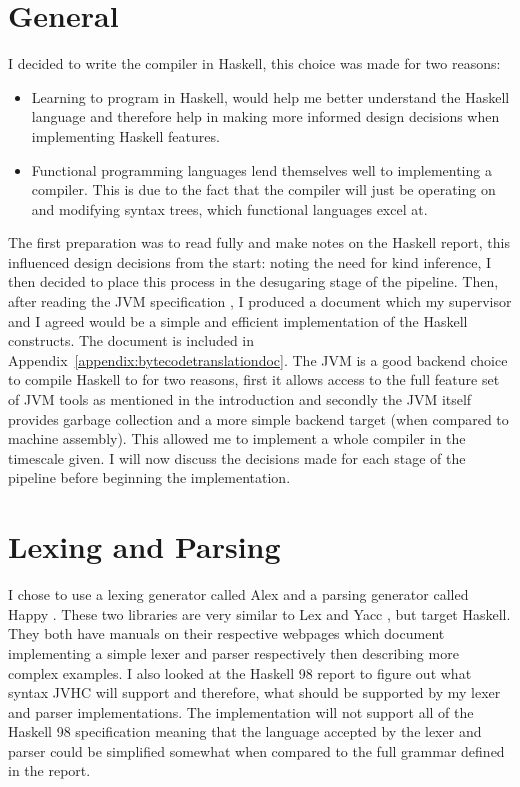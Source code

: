 \documentclass[float=false, crop=false]{standalone}
\begin{document}
\section{General}

I decided to write the compiler in Haskell, this choice was made for two reasons: 
\begin{itemize}
  \item Learning to program in Haskell, would help me better understand the Haskell language
    and therefore help in making more informed design decisions when implementing Haskell features.

  \item Functional programming languages lend themselves well to implementing a compiler. This is due to the fact that the compiler will just be operating
    on and modifying syntax trees, which functional languages excel at.

\end{itemize}

  The first preparation was to read fully and make notes on
  the Haskell report, this influenced design decisions from the start:
  noting the need for kind inference, I then decided to 
  place this process in the desugaring stage of the pipeline. 
  Then, after reading the JVM 
  specification \cite{jvm-spec8}, I produced a
  document which my supervisor and I agreed
  would be a simple and efficient implementation
  of the Haskell constructs. The document is included in 
  Appendix~\ref{appendix:bytecodetranslationdoc}. 
  The JVM is a good backend choice to compile Haskell to for two
  reasons, first it allows access to the full feature set
  of JVM tools as mentioned in the introduction and secondly
  the JVM itself provides garbage collection and 
  a more simple backend target (when compared to machine assembly).
  This allowed me to implement a whole compiler in the timescale given.
  I will now discuss the decisions made for each stage of the 
  pipeline before beginning the implementation.

\section{Lexing and Parsing}

I chose to use a lexing generator called Alex \cite{alex-lib} and a parsing generator called Happy \cite{happy-lib}.
These two libraries are very similar to Lex \cite{lex-lib} and Yacc
\cite{yacc-lib}, but target Haskell.
They both have manuals on their respective webpages which document 
implementing a simple lexer and parser respectively then describing
more complex examples.
I also looked at the Haskell 98 report \cite[.,3.]{haskell98-spec}
to figure out what syntax JVHC will support and therefore, what 
should be supported by my lexer and parser implementations.
The implementation will not support all of the Haskell 98 
specification meaning that the language accepted by the lexer and 
parser could be simplified somewhat when compared to the full
grammar defined in the report.
\end{document}

